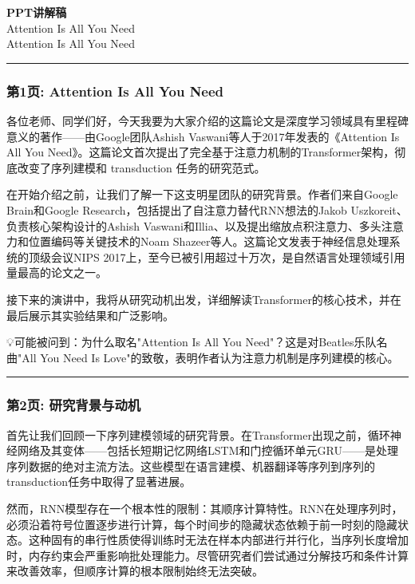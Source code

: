 \documentclass[11pt,a4paper]{article}
\begin{document}
\begin{center}
{\LARGE\bfseries PPT讲解稿}\\[0.5em]
{\large Attention Is All You Need}\\[0.3em]
{\normalsize Attention Is All You Need}
\end{center}
\vspace{1em}
\noindent\rule{\textwidth}{0.4pt}
\vspace{1em}


\subsubsection*{第1页: Attention Is All You Need}

各位老师、同学们好，今天我要为大家介绍的这篇论文是深度学习领域具有里程碑意义的著作——由Google团队Ashish Vaswani等人于2017年发表的《Attention Is All You Need》。这篇论文首次提出了完全基于注意力机制的Transformer架构，彻底改变了序列建模和 transduction 任务的研究范式。

在开始介绍之前，让我们了解一下这支明星团队的研究背景。作者们来自Google Brain和Google Research，包括提出了自注意力替代RNN想法的Jakob Uszkoreit、负责核心架构设计的Ashish Vaswani和Illia、以及提出缩放点积注意力、多头注意力和位置编码等关键技术的Noam Shazeer等人。这篇论文发表于神经信息处理系统的顶级会议NIPS 2017上，至今已被引用超过十万次，是自然语言处理领域引用量最高的论文之一。

接下来的演讲中，我将从研究动机出发，详细解读Transformer的核心技术，并在最后展示其实验结果和广泛影响。

💡可能被问到：为什么取名"Attention Is All You Need"？这是对Beatles乐队名曲"All You Need Is Love"的致敬，表明作者认为注意力机制是序列建模的核心。

\vspace{0.5em}\noindent\rule{\textwidth}{0.4pt}\vspace{0.5em}

\subsubsection*{第2页: 研究背景与动机}

首先让我们回顾一下序列建模领域的研究背景。在Transformer出现之前，循环神经网络及其变体——包括长短期记忆网络LSTM和门控循环单元GRU——是处理序列数据的绝对主流方法。这些模型在语言建模、机器翻译等序列到序列的transduction任务中取得了显著进展。

然而，RNN模型存在一个根本性的限制：其顺序计算特性。RNN在处理序列时，必须沿着符号位置逐步进行计算，每个时间步的隐藏状态依赖于前一时刻的隐藏状态。这种固有的串行性质使得训练时无法在样本内部进行并行化，当序列长度增加时，内存约束会严重影响批处理能力。尽管研究者们尝试通过分解技巧和条件计算来改善效率，但顺序计算的根本限制始终无法突破。
\end{document}
